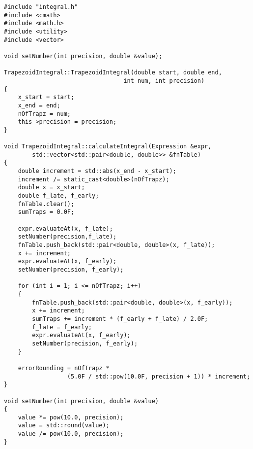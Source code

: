 \documentclass[12pt, letterpaper]{article}
\begin{document}
\begin{lstlisting}[caption=integral.cpp]
#include "integral.h"
#include <cmath>
#include <math.h>
#include <utility>
#include <vector>

void setNumber(int precision, double &value);

TrapezoidIntegral::TrapezoidIntegral(double start, double end,
                                  int num, int precision)
{
    x_start = start;
    x_end = end;
    nOfTrapz = num;
    this->precision = precision;
}

void TrapezoidIntegral::calculateIntegral(Expression &expr,
        std::vector<std::pair<double, double>> &fnTable)
{
    double increment = std::abs(x_end - x_start);
    increment /= static_cast<double>(nOfTrapz);
    double x = x_start;
    double f_late, f_early;
    fnTable.clear();
    sumTraps = 0.0F;

    expr.evaluateAt(x, f_late);
    setNumber(precision,f_late);
    fnTable.push_back(std::pair<double, double>(x, f_late));
    x += increment;
    expr.evaluateAt(x, f_early);
    setNumber(precision, f_early);

    for (int i = 1; i <= nOfTrapz; i++)
    {
        fnTable.push_back(std::pair<double, double>(x, f_early));
        x += increment;
        sumTraps += increment * (f_early + f_late) / 2.0F;
        f_late = f_early;
        expr.evaluateAt(x, f_early);
        setNumber(precision, f_early);
    }    

    errorRounding = nOfTrapz * 
                  (5.0F / std::pow(10.0F, precision + 1)) * increment;
}

void setNumber(int precision, double &value)
{
    value *= pow(10.0, precision);
    value = std::round(value);
    value /= pow(10.0, precision);
}
\end{lstlisting}
\end{document}
